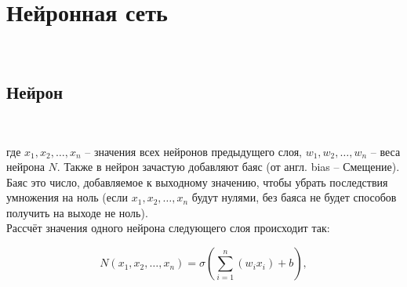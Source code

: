 \documentclass{article}
\begin{document}






    


    \section{Нейронная сеть}
    \ \\
        


        \subsection{Нейрон}
        \label{sec:neuron}
        \ \\

        
        \figneuron

        где $x_1, x_2, \ldots, x_n$ -- значения всех нейронов предыдущего
        слоя, $w_1, w_2, \ldots, w_n$ -- веса нейрона $N$. Также
        в нейрон зачастую добавляют баяс (от англ. bias -- Смещение).
        Баяс это число, добавляемое к выходному значению, чтобы убрать
        последствия умножения на ноль (если $x_1, x_2, \ldots, x_n$ 
        будут нулями, без баяса не будет способов получить на выходе
        не ноль).\\
        
        Рассчёт значения одного нейрона следующего слоя происходит так:
        
        
        \[
            N(x_1, x_2, \ldots, x_n) = 
            \sigma\left( 
                \sum_{i = 1}^{n}\left( w_i x_i \right) + b 
            \right),
        \]
\end{document}
